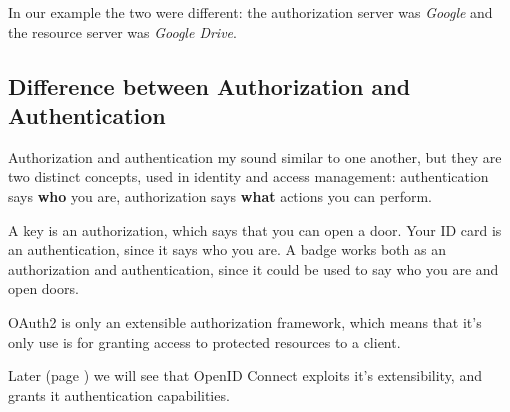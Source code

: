 In our example the two were different: the authorization server was
\textit{Google} and the resource server was \textit{Google Drive}.

\subsection{Difference between Authorization and Authentication}
Authorization and authentication my sound similar to one another, but they are
two distinct concepts, used in identity and access management:
authentication says \textbf{who} you are, authorization says \textbf{what}
actions you can perform.

A key is an authorization, which says that you can open a door. Your ID card is
an authentication, since it says who you are.
A badge works both as an authorization and authentication, since it could be
used to say who you are and open doors.

OAuth2 is only an extensible authorization framework, which means that it's
only use is for granting access to protected resources to a client.

Later (page \pageref{openid}) we will see that OpenID Connect exploits it's
extensibility, and grants it authentication capabilities.
